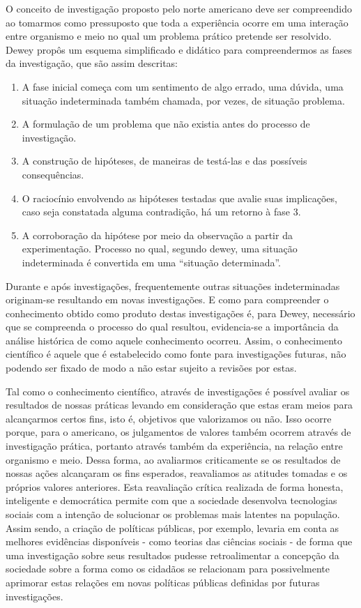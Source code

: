 \documentclass[12pt]{report}
\begin{document}
		O conceito de investigação proposto pelo norte americano deve ser compreendido ao tomarmos como pressuposto que toda a experiência ocorre em uma interação entre organismo e meio no qual um problema prático pretende ser resolvido.
		Dewey propôs um esquema simplificado e didático para compreendermos as fases da investigação, que são assim descritas:
	
			\begin{enumerate}
				\singlespacing
				\item A fase inicial começa com um sentimento de algo errado, uma dúvida, uma situação indeterminada também chamada, por vezes, de situação problema.
				\item A formulação de um problema que não existia antes do processo de investigação.
				\item A construção de hipóteses, de maneiras de testá-las e das possíveis consequências.
				\item O raciocínio envolvendo as hipóteses testadas que avalie suas implicações, caso seja constatada alguma contradição, há um retorno à fase 3.
				\item A corroboração da hipótese por meio da observação a partir da experimentação.
				Processo no qual, segundo dewey, uma situação indeterminada é convertida em uma “situação determinada”.
		\end{enumerate}
	
		\onehalfspacing 
		Durante e após investigações, frequentemente outras situações indeterminadas originam-se resultando em novas investigações.
		E como para compreender o conhecimento obtido como produto destas investigações é, para Dewey, necessário que se compreenda o processo do qual resultou, evidencia-se a importância da análise histórica de como aquele conhecimento ocorreu.
		Assim, o conhecimento científico é aquele que é estabelecido como fonte para investigações futuras, não podendo ser fixado de modo a não estar sujeito a revisões por estas.
		
		Tal como o conhecimento científico, através de investigações é possível avaliar os resultados de nossas práticas levando em consideração que estas eram meios para alcançarmos certos fins, isto é, objetivos que valorizamos ou não.
		Isso ocorre porque, para o americano, os julgamentos de valores também ocorrem através de investigação prática, portanto através também da experiência, na relação entre organismo e meio.
		Dessa forma, ao avaliarmos criticamente se os resultados de nossas ações alcançaram os fins esperados, reavaliamos as atitudes tomadas e os próprios valores anteriores.
		Esta reavaliação crítica realizada de forma honesta, inteligente e democrática permite com que a sociedade desenvolva tecnologias sociais com a intenção de solucionar os problemas mais latentes na população.
		Assim sendo, a criação de políticas públicas, por exemplo, levaria em conta as melhores evidências disponíveis - como teorias das ciências sociais - de forma que uma investigação sobre seus resultados pudesse retroalimentar a concepção da sociedade sobre a forma como os cidadãos se relacionam para possivelmente aprimorar estas relações em novas políticas públicas definidas por futuras investigações.
		
\end{document}
